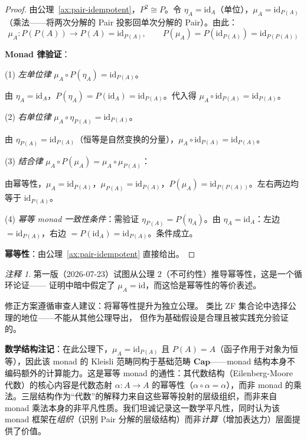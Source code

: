 \documentclass[11pt,a4paper]{article}
\theoremstyle{definition}
\theoremstyle{definition}
\theoremstyle{remark}
\newtheorem{remark}[theorem]{注释}
\newcommand{\cat}[1]{\mathbf{#1}}
\newcommand{\catCap}{\cat{Cap}}
\newcommand{\id}{\mathrm{id}}
\newcommand{\pairMonad}{P}
\begin{document}
\begin{proof}
由公理~\ref{ax:pair-idempotent}，$\pairMonad^2 \cong \pairMonad$。令 $\eta_A = \id_A$（单位），$\mu_A = \id_{\pairMonad(A)}$（乘法——将两次分解的 Pair 投影回单次分解的 Pair）。由此：
\[
\mu_A: \pairMonad(\pairMonad(A)) \to \pairMonad(A) = \id_{\pairMonad(A)}, \qquad
\pairMonad(\mu_A) = \pairMonad(\id_{\pairMonad(A)}) = \id_{\pairMonad(\pairMonad(A))}
\]

\textbf{Monad 律验证}：

(1) \textit{左单位律} $\mu_A \circ \pairMonad(\eta_A) = \id_{\pairMonad(A)}$。

由 $\eta_A = \id_A$，$\pairMonad(\eta_A) = \pairMonad(\id_A) = \id_{\pairMonad(A)}$。代入得 $\mu_A \circ \id_{\pairMonad(A)} = \id_{\pairMonad(A)}$。\checkmark

(2) \textit{右单位律} $\mu_A \circ \eta_{\pairMonad(A)} = \id_{\pairMonad(A)}$。

由 $\eta_{\pairMonad(A)} = \id_{\pairMonad(A)}$（恒等是自然变换的分量），$\mu_A \circ \id_{\pairMonad(A)} = \id_{\pairMonad(A)}$。\checkmark

(3) \textit{结合律} $\mu_A \circ \pairMonad(\mu_A) = \mu_A \circ \mu_{\pairMonad(A)}$：

由幂等性，$\mu_A = \id_{\pairMonad(A)}$，$\mu_{\pairMonad(A)} = \id_{\pairMonad(A)}$，$\pairMonad(\mu_A) = \id_{\pairMonad(\pairMonad(A))}$。左右两边均等于 $\id_{\pairMonad(A)}$。\checkmark

(4) \textit{幂等 monad 一致性条件}：需验证 $\eta_{\pairMonad(A)} = \pairMonad(\eta_A)$。由 $\eta_A = \id_A$：左边 $= \id_{\pairMonad(A)}$，右边 $= \pairMonad(\id_A) = \id_{\pairMonad(A)}$。条件成立。\checkmark

\textbf{幂等性}：由公理~\ref{ax:pair-idempotent} 直接给出。\hfill\qedsymbol
\end{proof}

\begin{remark}
第一版（2026-07-23）试图从公理 2（不可约性）推导幂等性，这是一个循环论证——
证明中暗中假定了 $\mu_A = \id$，而这恰是幂等性的等价表述。

修正方案遵循审查人建议：将幂等性提升为独立公理。
类比 ZF 集合论中选择公理的地位——不能从其他公理导出，
但作为基础假设是合理且被实践充分验证的。

\textbf{数学结构注记}：在此公理下，$\mu_A = \id_{\pairMonad(A)}$ 且 $\pairMonad(A) = A$（函子作用于对象为恒等），因此该 monad 的 Kleisli 范畴同构于基础范畴 $\catCap$——monad 结构本身不编码额外的计算能力。这是幂等 monad 的通性：其代数结构（Eilenberg-Moore 代数）的核心内容是代数态射 $\alpha: A \to A$ 的幂等性（$\alpha \circ \alpha = \alpha$），而非 monad 的乘法。三层结构作为``代数''的解释力来自这些幂等投射的层级组织，而非来自 monad 乘法本身的非平凡性质。我们坦诚记录这一数学平凡性，同时认为该 monad 框架在\emph{组织}（识别 Pair 分解的层级结构）而非\emph{计算}（增加表达力）层面提供了价值。
\end{remark}
\end{document}
